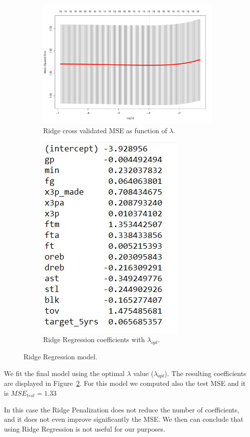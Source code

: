 \begin{figure}[h]
	\centering
	\begin{subfigure}{.6\textwidth}
		\centering
		\includegraphics[width=0.7\linewidth]{ImageFiles/Regression/Ridge/RidgeCvPlot}
		\caption{Ridge cross validated MSE as function of $\lambda$.}
		\label{fig:RidgeCvPlot}
	\end{subfigure}%
	\begin{subfigure}{.6\textwidth}
		\centering
		\includegraphics[width=0.4\linewidth]{ImageFiles/Regression/Ridge/FinalRidgeCoef}
		\caption{Ridge Regression coefficients with $\lambda_{opt}$.}
		\label{fig:FinalRidgeCoef}
	\end{subfigure}
	\caption{Ridge Regression model.}
	\label{fig:FinalRidgeModel}
\end{figure}

We fit the final model using the optimal $\lambda$ value ($\lambda_{opt}$). The resulting coefficients are displayed in Figure~\ref{fig:FinalRidgeCoef}. For this model we computed also the test MSE and it is $MSE_{test} = 1.33$

In this case the Ridge Penalization does not reduce the number of coefficients, and it does not even improve significantly the MSE. We then can conclude that using Ridge Regression is not useful for our purposes.
